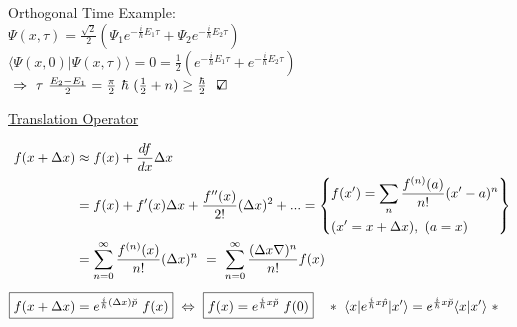 \documentclass[12pt]{article}
\newcommand{\checkedbox}{\mbox{\ooalign{$\checkmark$\cr\hidewidth$\square$\hidewidth\cr}}} %
\begin{document}
\begin{itemize}
\begin{minipage}[t]{.9\textwidth}
        \vspace{15pt}
        \hspace{18pt} Orthogonal Time Example: \\[10pt]
        \hspace{18pt} \hspace{18pt} \( \Psi(x,\tau) = \frac{\sqrt{2}}{2} 
            ( \Psi_1 e^{-\frac{i}{\hbar} E_1 \tau} 
            + \Psi_2 e^{-\frac{i}{\hbar} E_2 \tau} ) \) \\[10pt]
        \hspace{18pt} \hspace{18pt} \( \Big\langle \Psi(x,0) \big| \Psi(x,\tau) \Big\rangle = 0 
            = \frac{1}{2} ( e^{-\frac{i}{\hbar} E_1 \tau} 
            + e^{-\frac{i}{\hbar} E_2 \tau} ) \) \\[10pt]
        \hspace{18pt} \hspace{18pt} \( \ \Rightarrow \ \tau \ \frac{E_2 - E_1}{2} 
            = \frac{\pi}{2} \ \hbar \ (\frac{1}{2} + n) \geq \frac{\hbar}{2} \ \ \checkedbox \)
    \end{minipage}
\end{itemize}

\newpage \noindent
\underline{Translation Operator}

\vspace{-10pt}
\begin{align*}
    f(x + \Delta x) &\approx f(x) + \frac{df}{dx} \Delta x \\
    &= f(x) + f'(x) \Delta x + \frac{f''(x)}{2!} (\Delta x)^2 + ... 
        = \left\{ \begin{aligned}
            &f(x') = \sum_{n} \frac{ f^{(n)}(a) }{n!} (x'-a)^n \\
            &(x' = x + \Delta x), \ (a = x)
        \end{aligned} \right\} 
        \\
    &= \sum_{n=0}^\infty \frac{ f^{(n)}(x) }{n!} (\Delta x)^n 
        \ = \ \sum_{n=0}^\infty \frac{ (\Delta x \nabla)^n }{n!} f(x) 
        \\[5pt]
    \Aboxed{ f(x + \Delta x) &= e^{\frac{i}{\hbar} (\Delta x) \breve{p}} \ f(x) }
        \ \Leftrightarrow \ \boxed{ f(x) = e^{\frac{i}{\hbar} x \breve{p}} \ f(0) }
        \hspace{10pt} *\ \langle x | e^{\frac{i}{\hbar} x \hat{p}} | x' \rangle 
        =  e^{\frac{i}{\hbar} x \breve{p}} \langle x | x' \rangle \ *
\end{align*}    
\end{document}
